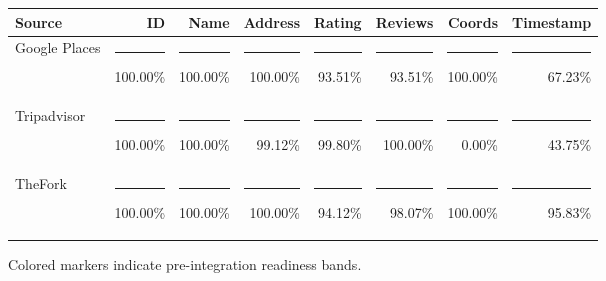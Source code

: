{\scriptsize
\begin{tabular}{lrrrrrrr}
\toprule
Source & ID & Name & Address & Rating & Reviews & Coords & Timestamp \\
\midrule
Google Places & \textcolor{qualitygreen}{\rule{2.5mm}{4pt}} 100.00\% & \textcolor{qualitygreen}{\rule{2.5mm}{4pt}} 100.00\% & \textcolor{qualitygreen}{\rule{2.5mm}{4pt}} 100.00\% & \textcolor{qualityblue}{\rule{2.5mm}{4pt}} 93.51\% & \textcolor{qualityblue}{\rule{2.5mm}{4pt}} 93.51\% & \textcolor{qualitygreen}{\rule{2.5mm}{4pt}} 100.00\% & \textcolor{qualityorange}{\rule{2.5mm}{4pt}} 67.23\% \\
Tripadvisor & \textcolor{qualitygreen}{\rule{2.5mm}{4pt}} 100.00\% & \textcolor{qualitygreen}{\rule{2.5mm}{4pt}} 100.00\% & \textcolor{qualitygreen}{\rule{2.5mm}{4pt}} 99.12\% & \textcolor{qualitygreen}{\rule{2.5mm}{4pt}} 99.80\% & \textcolor{qualitygreen}{\rule{2.5mm}{4pt}} 100.00\% & \textcolor{qualityred}{\rule{2.5mm}{4pt}} 0.00\% & \textcolor{qualityred}{\rule{2.5mm}{4pt}} 43.75\% \\
TheFork & \textcolor{qualitygreen}{\rule{2.5mm}{4pt}} 100.00\% & \textcolor{qualitygreen}{\rule{2.5mm}{4pt}} 100.00\% & \textcolor{qualitygreen}{\rule{2.5mm}{4pt}} 100.00\% & \textcolor{qualityblue}{\rule{2.5mm}{4pt}} 94.12\% & \textcolor{qualitygreen}{\rule{2.5mm}{4pt}} 98.07\% & \textcolor{qualitygreen}{\rule{2.5mm}{4pt}} 100.00\% & \textcolor{qualitygreen}{\rule{2.5mm}{4pt}} 95.83\% \\
\bottomrule
\end{tabular}
}

{\footnotesize Colored markers indicate pre-integration readiness bands.}
